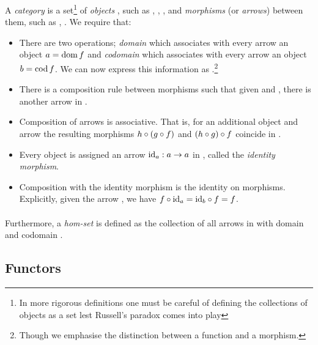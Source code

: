 \begin{categorydef}
  A \emph{category}  is a set\footnote{In more rigorous definitions one must be careful of defining the collections of objects as a set lest Russell's paradox comes into play} of \emph{objects} , such as , , , and \emph{morphisms} (or \emph{arrows})  between them, such as , . We require that:
  \begin{itemize}
    \item There are two operations; \emph{domain} which associates with every arrow  an object $\mathnormal{a} = \mathrm{dom}\,\mathnormal{f}$ and \emph{codomain} which associates with every arrow  an object $\mathnormal{b} = \mathrm{cod}\,\mathnormal{f}$. We can now express this information as .\footnote{Though we emphasise the distinction between a function and a morphism.}
    \item There is a composition rule between morphisms such that given  and , there is another arrow  in .
    \item Composition of arrows is associative. That is, for an additional object  and arrow  the resulting morphisms $\mathnormal{h} \circ \left(\mathnormal{g} \circ \mathnormal{f}\right)$ and $\left(\mathnormal{h} \circ \mathnormal{g}\right) \circ \mathnormal{f}$ coincide in .
    \item Every object  is assigned an arrow $\mathrm{id}_{\mathnormal{a}}: \mathnormal{a} \to \mathnormal{a}$ in , called the \emph{identity morphism}.
    \item Composition with the identity morphism is the identity on morphisms. Explicitly, given the arrow , we have $\mathnormal{f} \circ \mathrm{id}_{\mathnormal{a}} = \mathrm{id}_{\mathnormal{b}} \circ \mathnormal{f} = \mathnormal{f}$.
  \end{itemize}
\end{categorydef}

\paragraph{}Furthermore, a \emph{hom-set}  is
defined as the collection of all arrows in  with domain  and
codomain .

\subsection{Functors}
\theoremstyle{definition}\newtheorem*{covfunctordef}{Functor}

